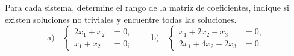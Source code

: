 \documentclass[compacto,10pt]{pubciencias-notas}
\begin{document}
\begin{ejer}
Para cada sistema, determine el rango de la matriz de coeficientes,
indique si existen soluciones no triviales y encuentre todas las soluciones.
\[
\text{a)}\quad
\left\{\begin{aligned}
    2x_1+x_2&=0,\\
    x_1+x_2&=0;
\end{aligned}\right.
\qquad
\text{b)}\quad
\left\{\begin{aligned}
    x_1+2x_2-x_3&=0,\\
    2x_1+4x_2-2x_3&=0.
\end{aligned}\right.
\]
\end{ejer}
\end{document}
